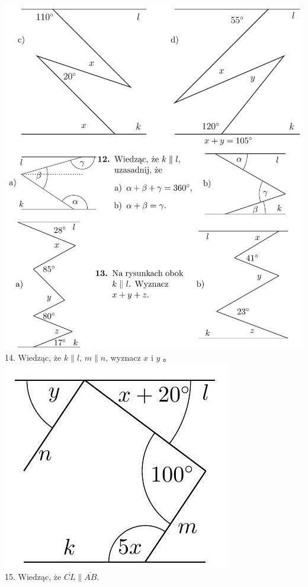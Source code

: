 \documentclass[10pt]{article}
\begin{document}
\includegraphics[max width=\textwidth, center]{2024_11_21_71f62bd117d375398909g-014(1)}\\
14. Wiedząc, że \(k \| l\), \(m \| n\), wyznacz \(x\) i \(y\) 。\\
\includegraphics[max width=\textwidth, center]{2024_11_21_71f62bd117d375398909g-014}\\
15. Wiedząc, że \(\overline{C L} \| \overline{A B}\).
\end{document}
